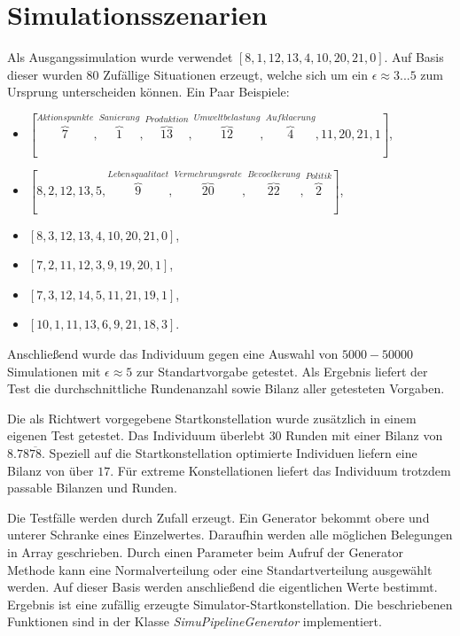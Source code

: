 \section{Simulationsszenarien}
Als Ausgangssimulation wurde verwendet \ensuremath{[8, 1, 12, 13, 4, 10, 20, 21, 0]}. Auf Basis dieser wurden $80$ Zufällige Situationen erzeugt, welche sich um ein \ensuremath{\epsilon \approx 3...5}  zum Ursprung unterscheiden können. Ein Paar Beispiele: 
\begin{itemize}
\item\ensuremath{[\overbrace{7}^{Aktionspunkte},\overbrace{1}^{Sanierung},	\overbrace{13}^{Produktion},	\overbrace{12}^{Umweltbelastung},	\overbrace{4}^{Aufklaerung},	11,	20,	21,	1]},
\item\ensuremath{[8,	2,	12,	13,	5,	\overbrace{9}^{Lebensqualitaet}, \overbrace{20}^{Vermehrungsrate},	\overbrace{22}^{Bevoelkerung},	\overbrace{2}^{Politik}]},
\item\ensuremath{[8,	3,	12,	13,	4,	10,	20,	21,	0]},
\item\ensuremath{[7,	2,	11,	12,	3,	9,	19,	20,	1]},
\item\ensuremath{[7,	3,	12,	14,	5,	11,	21,	19,	1]},
\item\ensuremath{[10,	1,	11,	13,	6,	9,	21,	18,	3]}.
\end{itemize}

Anschließend wurde das Individuum gegen eine Auswahl von $5000 - 50000$ Simulationen mit \ensuremath{\epsilon \approx 5} zur Standartvorgabe getestet. Als Ergebnis liefert der Test die durchschnittliche Rundenanzahl sowie Bilanz aller getesteten Vorgaben.

Die als Richtwert vorgegebene Startkonstellation wurde zusätzlich in einem eigenen Test getestet. Das Individuum überlebt $30$ Runden mit einer Bilanz von $8.78\overline{78}$. Speziell auf die Startkonstellation optimierte Individuen liefern eine Bilanz von über $17$. Für extreme Konstellationen liefert das Individuum trotzdem passable Bilanzen und Runden.

Die Testfälle werden durch Zufall erzeugt. Ein Generator bekommt obere und unterer Schranke eines Einzelwertes. Daraufhin werden alle möglichen Belegungen in Array geschrieben. Durch einen Parameter beim Aufruf der Generator Methode kann eine Normalverteilung oder eine Standartverteilung ausgewählt werden. Auf dieser Basis werden anschließend die eigentlichen Werte bestimmt. Ergebnis ist eine zufällig erzeugte Simulator-Startkonstellation. Die beschriebenen Funktionen sind in der Klasse \textit{SimuPipelineGenerator} implementiert.

